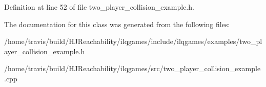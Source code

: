 Definition at line 52 of file two\+\_\+player\+\_\+collision\+\_\+example.\+h.



The documentation for this class was generated from the following files\+:\begin{DoxyCompactItemize}
\item 
/home/travis/build/\+H\+J\+Reachability/ilqgames/include/ilqgames/examples/two\+\_\+player\+\_\+collision\+\_\+example.\+h\item 
/home/travis/build/\+H\+J\+Reachability/ilqgames/src/two\+\_\+player\+\_\+collision\+\_\+example.\+cpp\end{DoxyCompactItemize}
